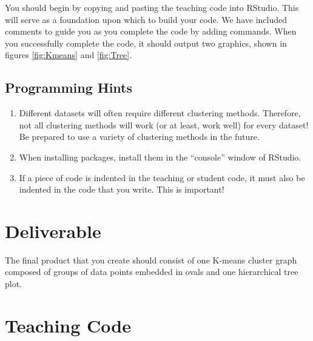 You should begin by copying and pasting the teaching code into RStudio.
This will serve as a foundation upon which to build your code.
We have included comments to guide you as you complete the code by adding commands.
When you successfully complete the code, it should output two graphics, shown in figures \ref{fig:Kmeans} and \ref{fig:Tree}.

\subsection{Programming Hints}

\begin{enumerate}
 
\item Different datasets will often require different clustering methods.
Therefore, not all clustering methods will work (or at least, work well) for every dataset!
Be prepared to use a variety of clustering methods in the future.
\item When installing packages, install them in the ``console'' window of RStudio.
\item If a piece of code is indented in the teaching or student code, it must also be indented in the code that you write.
This is important!
 
\end{enumerate}

\section{Deliverable}

The final product that you create should consist of one K-means cluster graph composed of groups of data points embedded in ovals and one hierarchical tree plot. 

\section{Teaching Code}

